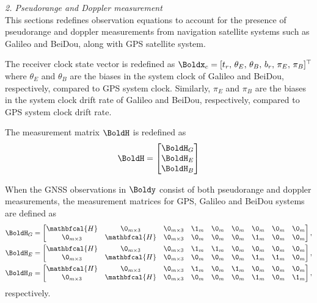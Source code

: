 \textit{2. Pseudorange  and Doppler measurement} \\
This sections redefines observation equations to account for the presence of
pseudorange and doppler measurements from navigation satellite systems such as Galileo and BeiDou, along with
GPS satellite system.

The receiver clock state vector is redefined as $\Boldx_c = [t_r, \, \theta_E, \, \theta_B, \, b_r, \, \pi_E, \, \pi_B]^\top$
where $\theta_E$ and $\theta_B$ are the biases in the system clock of Galileo and BeiDou,
respectively, compared to GPS system clock. Similarly, $\pi_E$ and $\pi_B$ are the biases 
in the system clock drift rate of Galileo and BeiDou, respectively, compared to GPS system clock drift rate.

The measurement matrix $\BoldH$ is redefined as
\begin{equation}
	\BoldH = 
	\begin{bmatrix}
		\BoldH_G  \\ \BoldH_E  \\ \BoldH_B 
	\end{bmatrix}
\end{equation}

When the GNSS observations in $\Boldy$ consist of both pseudorange and doppler measurements, the measurement matrices for GPS, Galileo and BeiDou systems are defined as
\begin{align}
	\BoldH_G &= \begin{bmatrix}		
		\mathbfcal{H} & \0_{m \times 3} & \0_{m \times 3} & \1_m & \0_m & \0_m & \0_m & \0_m & \0_m \\
		\0_{m \times 3} & \mathbfcal{H} & \0_{m \times 3} & \0_m & \0_m & \0_m & \1_m & \0_m & \0_m
	\end{bmatrix}, \nonumber \\
	\BoldH_E &= \begin{bmatrix}
		\mathbfcal{H} & \0_{m \times 3} & \0_{m \times 3} & \1_m & \1_m & \0_m  & \0_m & \0_m & \0_m\\
		\0_{m \times 3} & \mathbfcal{H} & \0_{m \times 3} & \0_m & \0_m & \0_m  & \1_m & \1_m & \0_m	
	\end{bmatrix}, \nonumber \\
	\BoldH_B &= \begin{bmatrix}		
		\mathbfcal{H} & \0_{m \times 3} & \0_{m \times 3} & \1_m & \0_m & \1_m  & \0_m & \0_m & \0_m\\
		\0_{m \times 3} & \mathbfcal{H} & \0_{m \times 3} & \0_m & \0_m & \0_m  & \1_m & \0_m & \1_m	
	\end{bmatrix},
\end{align} respectively.

